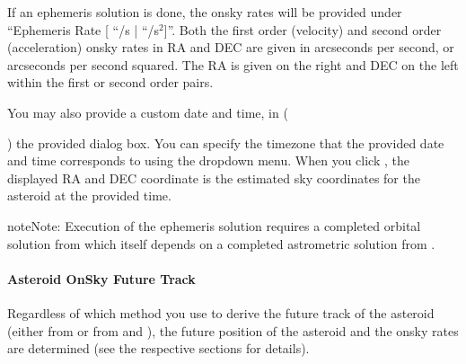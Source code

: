 \documentclass[letterpaper,11pt,english]{sphinxmanual}
\begin{document}
\sphinxAtStartPar
If an ephemeris solution is done, the on\sphinxhyphen{}sky rates will be provided under
“Ephemeris Rate {[} “/s | “/s$^{\text{2}}${]}”. Both the first order (velocity) and
second order (acceleration) on\sphinxhyphen{}sky rates in RA and DEC are given in arcseconds
per second, or arcseconds per second squared. The RA is given on the right and
DEC on the left within the first or second order pairs.

\sphinxAtStartPar
You may also provide a custom date and time, in
(%
\begin{footnote}[8]\sphinxAtStartFootnote
{}
%
\end{footnote}) the
provided dialog box. You can specify the timezone that the provided date and
time corresponds to using the dropdown menu. When you click ,
the displayed RA and DEC coordinate is the estimated sky coordinates for the
asteroid at the provided time.

\begin{sphinxadmonition}{note}{Note:}
\sphinxAtStartPar
Execution of the ephemeris solution requires a completed orbital
solution from {\hyperref[\detokenize{user/manual_mode:user-manual-mode-procedure-orbital-elements}]{}} which
itself depends on a completed astrometric solution from
{\hyperref[\detokenize{user/manual_mode:user-manual-mode-procedure-find-asteroid-location-compute-astrometric-solution}]{}}.
\end{sphinxadmonition}


\paragraph{Asteroid On\sphinxhyphen{}Sky Future Track}
\label{\detokenize{user/manual_mode:asteroid-on-sky-future-track}}\label{\detokenize{user/manual_mode:user-manual-procedure-asteroid-on-sky-future-track}}
\sphinxAtStartPar
Regardless of which method you use to derive the future track of the asteroid
(either from {\hyperref[\detokenize{user/manual_mode:user-manual-mode-procedure-asteroid-position-propagation}]{}} or
from {\hyperref[\detokenize{user/manual_mode:user-manual-mode-procedure-orbital-elements}]{}} and
{\hyperref[\detokenize{user/manual_mode:user-manual-mode-procedure-ephemeris}]{}}), the future position of the
asteroid and the on\sphinxhyphen{}sky rates are determined (see the respective sections
for details).
\end{document}
